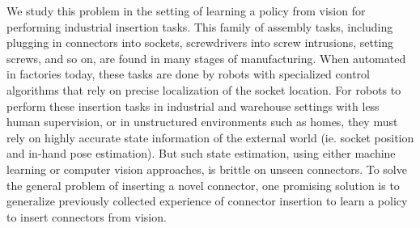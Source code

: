 \FloatBarrier

We study this problem in the setting of learning a policy from vision for performing industrial insertion tasks.
This family of assembly tasks, including plugging in connectors into sockets, screwdrivers into screw intrusions, setting screws, and so on, are found in many stages of manufacturing.
When automated in factories today, these tasks are done by robots with specialized control algorithms that rely on precise localization of the socket location.
For robots to perform these insertion tasks in industrial and warehouse settings with less human supervision, or in unstructured environments such as homes, they must rely on highly accurate state information of the external world (ie. socket position and in-hand pose estimation).
But such state estimation, using either machine learning or computer vision approaches, is brittle on unseen connectors.
To solve the general problem of inserting a novel connector, one promising solution is to generalize previously collected experience of connector insertion to learn a policy to insert connectors from vision.
